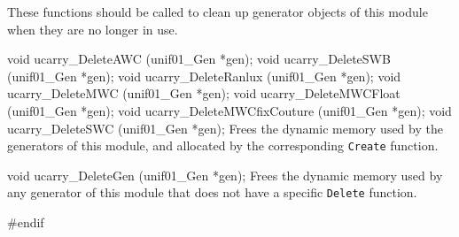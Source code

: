 {}

  These functions should be called to clean up generator objects of this
  module when they are no longer in use.

\code


void ucarry_DeleteAWC (unif01_Gen *gen);
void ucarry_DeleteSWB (unif01_Gen *gen);
void ucarry_DeleteRanlux (unif01_Gen *gen);
void ucarry_DeleteMWC (unif01_Gen *gen);
void ucarry_DeleteMWCFloat (unif01_Gen *gen);
void ucarry_DeleteMWCfixCouture (unif01_Gen *gen);
void ucarry_DeleteSWC (unif01_Gen *gen);
\endcode
 \tab Frees the dynamic memory used by the generators of this module,
  and allocated by the corresponding {\tt Create} function.
 \endtab
\code


void ucarry_DeleteGen (unif01_Gen *gen);
\endcode
 \tab Frees the dynamic memory used by any generator of this module
  that does not have a specific {\tt Delete} function.
 \endtab
\code

\hide
#endif
\endhide
\endcode
